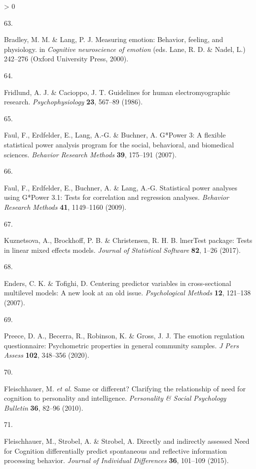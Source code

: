 \documentclass[
  english,
  man,floatsintext]{apa6}
\newlength{\cslhangindent}
\newlength{\csllabelwidth}
\newenvironment{CSLReferences}[2] %
 {%
  \setlength{\parindent}{0pt}
  \ifodd #1 \everypar{\setlength{\hangindent}{\cslhangindent}}\ignorespaces\fi
  \ifnum #2 > 0
  \setlength{\parskip}{#2\baselineskip}
  \fi
 }%
 {}
\newcommand{\CSLLeftMargin}[1]{\parbox[t]{\csllabelwidth}{#1}}
\newcommand{\CSLRightInline}[1]{\parbox[t]{\linewidth - \csllabelwidth}{#1}\break}
\begin{document}
\begin{CSLReferences}{0}{0}
\leavevmode\hypertarget{ref-Bradley2000}{}%
\CSLLeftMargin{63. }
\CSLRightInline{Bradley, M. M. \& Lang, P. J. Measuring emotion: Behavior, feeling, and physiology. in \emph{Cognitive neuroscience of emotion} (eds. Lane, R. D. \& Nadel, L.) 242--276 (Oxford University Press, 2000).}

\leavevmode\hypertarget{ref-Fridlund1986}{}%
\CSLLeftMargin{64. }
\CSLRightInline{Fridlund, A. J. \& Cacioppo, J. T. Guidelines for human electromyographic research. \emph{Psychophysiology} \textbf{23}, 567--89 (1986).}

\leavevmode\hypertarget{ref-Faul2007}{}%
\CSLLeftMargin{65. }
\CSLRightInline{Faul, F., Erdfelder, E., Lang, A.-G. \& Buchner, A. G*{Power} 3: {A} flexible statistical power analysis program for the social, behavioral, and biomedical sciences. \emph{Behavior Research Methods} \textbf{39}, 175--191 (2007).}

\leavevmode\hypertarget{ref-Faul2009}{}%
\CSLLeftMargin{66. }
\CSLRightInline{Faul, F., Erdfelder, E., Buchner, A. \& Lang, A.-G. Statistical power analyses using {G}*{Power} 3.1: {Tests} for correlation and regression analyses. \emph{Behavior Research Methods} \textbf{41}, 1149--1160 (2009).}

\leavevmode\hypertarget{ref-Kuznetsova2017}{}%
\CSLLeftMargin{67. }
\CSLRightInline{Kuznetsova, A., Brockhoff, P. B. \& Christensen, R. H. B. {lmerTest} package: Tests in linear mixed effects models. \emph{Journal of Statistical Software} \textbf{82}, 1--26 (2017).}

\leavevmode\hypertarget{ref-Enders2007}{}%
\CSLLeftMargin{68. }
\CSLRightInline{Enders, C. K. \& Tofighi, D. Centering predictor variables in cross-sectional multilevel models: {A} new look at an old issue. \emph{Psychological Methods} \textbf{12}, 121--138 (2007).}

\leavevmode\hypertarget{ref-Preece2020}{}%
\CSLLeftMargin{69. }
\CSLRightInline{Preece, D. A., Becerra, R., Robinson, K. \& Gross, J. J. The emotion regulation questionnaire: Psychometric properties in general community samples. \emph{J Pers Assess} \textbf{102}, 348--356 (2020).}

\leavevmode\hypertarget{ref-Fleischhauer2010}{}%
\CSLLeftMargin{70. }
\CSLRightInline{Fleischhauer, M. \emph{et al.} Same or different? {Clarifying} the relationship of need for cognition to personality and intelligence. \emph{Personality \& Social Psychology Bulletin} \textbf{36}, 82--96 (2010).}

\leavevmode\hypertarget{ref-Fleischhauer2015}{}%
\CSLLeftMargin{71. }
\CSLRightInline{Fleischhauer, M., Strobel, A. \& Strobel, A. Directly and indirectly assessed {N}eed for {C}ognition differentially predict spontaneous and reflective information processing behavior. \emph{Journal of Individual Differences} \textbf{36}, 101--109 (2015).}

\end{CSLReferences}
\end{document}
